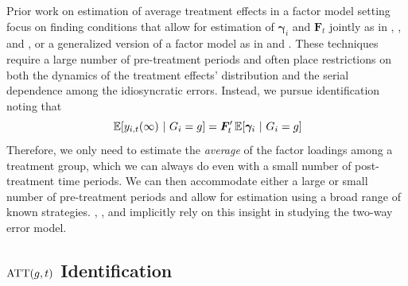 \documentclass[12pt]{article}
\begin{document}
Prior work on estimation of average treatment effects in a factor model setting focus on finding conditions that allow for estimation of $\bm \gamma_i$ and $\bm{F}_t$ jointly as in \citet{Gobillon_Magnac_2016}, \citet{xu2017generalized}, and \citet{Bai_Ng_2021}, or a generalized version of a factor model as in \citet{Feng_2020} and \citet{arkhangelsky2021synthetic}. These techniques require a large number of pre-treatment periods and often place restrictions on both the dynamics of the treatment effects' distribution and the serial dependence among the idiosyncratic errors. Instead, we pursue identification noting that 
\begin{equation}\label{eq:untreated_cond_expectation}
\expec{y_{i,t}(\infty)}{G_i = g} = \bm{F}_t' \expec{\bm \gamma_i}{G_i = g}
\end{equation}
Therefore, we only need to estimate the \emph{average} of the factor loadings among a treatment group, which we can always do even with a small number of post-treatment time periods. We can then accommodate either a large or small number of pre-treatment periods and allow for estimation using a broad range of known strategies. \citet{Gardner_2021}, \citet{Wooldridge_2021}, and \citet{Borusyak_Jaravel_Spiess_2021} implicitly rely on this insight in studying the two-way error model.

\subsection{\texorpdfstring{$\text{ATT}(g,t)$}{ATT(g,t)} Identification}\label{sec:ATT_identification}
\end{document}
